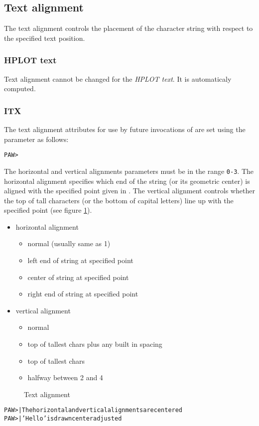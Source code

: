 \subsection*{Text alignment}
The text alignment controls the placement of the character string  with 
respect to the specified text position.
\subsubsection{HPLOT text}
Text alignment cannot be changed for the
{\em HPLOT text}. It is automaticaly computed.
\subsubsection{ITX}
The text alignment attributes for use by future invocations of 
are set using the  parameter as follows:
\begin{alltt}
PAW > 
\end{alltt}
The horizontal and 
vertical alignments parameters must be in the range \texttt{0-3}. The horizontal 
alignment specifies which end of the string (or its geometric center) is 
aligned with the specified point given in .
The vertical alignment controls whether the top of tall characters
(or the bottom of capital letters) line up with the specified point 
(see figure \ref{fig:ALIGN}).
\begin{itemize}
\item[ITXALH] horizontal alignment
\begin{itemize}
\item[0] normal (usually same as 1)
\item[1] left end of string at specified point
\item[2] center of string at specified point
\item[3] right end of string at specified point
\end{itemize}
\item[ITXALH] vertical alignment
\begin{itemize}
\item[0] normal
\item[1] top of tallest chars plus any built in spacing
\item[2] top of tallest chars
\item[3] halfway between 2 and 4 
\end{itemize}
\end{itemize}
\begin{figure}
\begin{center}\mbox{}\end{center}
\caption{Text alignment}
\label{fig:ALIGN}
\end{figure}
\begin{alltt}
PAW >    | The horizontal and vertical alignments are centered
PAW >  | 'Hello' is drawn center adjusted
\end{alltt}
